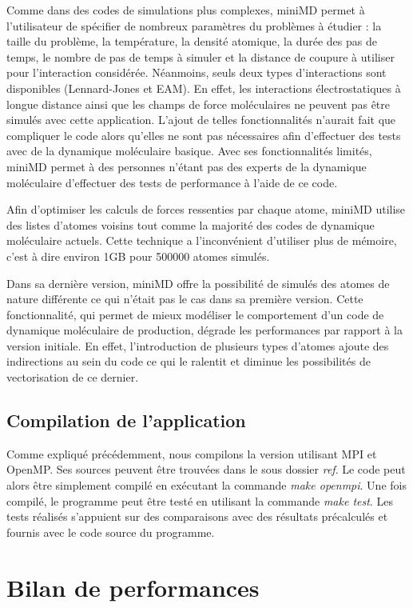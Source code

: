 \documentclass[11pt,a4paper]{article}
\begin{document}
	Comme dans des codes de simulations plus complexes, miniMD permet à l'utilisateur de spécifier de nombreux paramètres du problèmes à étudier : la taille du problème, la température, la densité atomique, la durée des pas de temps, le nombre de pas de temps à simuler et la distance de coupure à utiliser pour l'interaction considérée. Néanmoins, seuls deux types d'interactions sont disponibles (Lennard-Jones et EAM). En effet, les interactions électrostatiques à longue distance ainsi que les champs de force moléculaires ne peuvent pas être simulés avec cette application. L'ajout de telles fonctionnalités n'aurait fait que compliquer le code alors qu'elles ne sont pas nécessaires afin d'effectuer des tests avec de la dynamique moléculaire basique. Avec ses fonctionnalités limités, miniMD permet à des personnes n'étant pas des experts de la dynamique moléculaire d'effectuer des tests de performance à l'aide de ce code.

	Afin d'optimiser les calculs de forces ressenties par chaque atome, miniMD utilise des listes d'atomes voisins tout comme la majorité des codes de dynamique moléculaire actuels. Cette technique a l'inconvénient d'utiliser plus de mémoire, c'est à dire environ 1GB pour 500000 atomes simulés.

	Dans sa dernière version, miniMD offre la possibilité de simulés des atomes de nature différente ce qui n'était pas le cas dans sa première version. Cette fonctionnalité, qui permet de mieux modéliser le comportement d'un code de dynamique moléculaire de production, dégrade les performances par rapport à la version initiale. En effet, l'introduction de plusieurs types d'atomes ajoute des indirections au sein du code ce qui le ralentit et diminue les possibilités de vectorisation de ce dernier.

	\subsection{Compilation de l'application}
		Comme expliqué précédemment, nous compilons la version utilisant MPI et OpenMP. Ses sources peuvent être trouvées dans le sous dossier \textit{ref}. Le code peut alors être simplement compilé en exécutant la commande \textit{make openmpi}. Une fois compilé, le programme peut être testé en utilisant la commande \textit{make test}. Les tests réalisés s'appuient sur des comparaisons avec des résultats précalculés et fournis avec le code source du programme.
\section{Bilan de performances}
\end{document}
